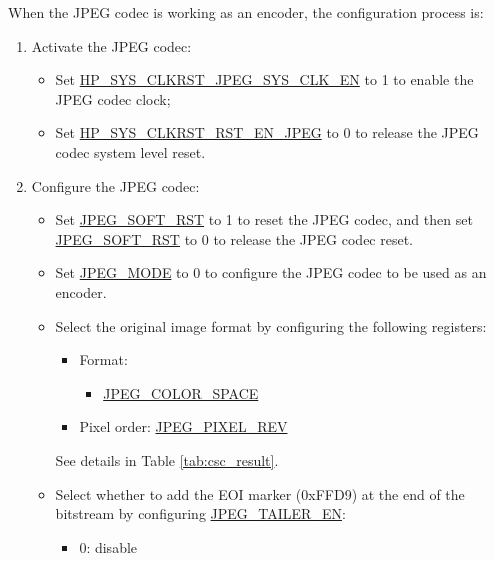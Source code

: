 \documentclass[main\_\_EN.tex]{subfiles}
\begin{document}
When the JPEG codec is working as an encoder, the configuration process is:
\begin{enumerate}
    \item Activate the JPEG codec:
    \begin{itemize}
        \item Set \hyperref[fielddesc:HPSYSCLKRSTJPEGSYSCLKEN]{HP\_SYS\_CLKRST\_JPEG\_SYS\_CLK\_EN} to 1 to enable the JPEG codec clock;
        \item Set \hyperref[fielddesc:HPSYSCLKRSTRSTENJPEG]{HP\_SYS\_CLKRST\_RST\_EN\_JPEG} to 0 to release the JPEG codec system level reset.
    \end{itemize}
    \item Configure the JPEG codec:
    \begin{itemize}
        \item Set \hyperref[fielddesc:JPEGSOFTRST]{JPEG\_SOFT\_RST} to 1 to reset the JPEG codec, and then set \hyperref[fielddesc:JPEGSOFTRST]{JPEG\_SOFT\_RST} to 0 to release the JPEG codec reset.
        \item Set \hyperref[fielddesc:JPEGMODE]{JPEG\_MODE} to 0 to configure the JPEG codec to be used as an encoder.
        \item Select the original image format by configuring the following registers:
        \begin{itemize}
            \item Format:
                \begin{itemize}
                    \item \hyperref[fielddesc:JPEGCOLORSPACE]{JPEG\_COLOR\_SPACE}
                \end{itemize}
            \item Pixel order: \hyperref[fielddesc:JPEGPIXELREV]{JPEG\_PIXEL\_REV}
        \end{itemize}
        See details in Table \ref{tab:csc_result}.
        \item Select whether to add the EOI marker (0xFFD9) at the end of the bitstream by configuring \hyperref[fielddesc:JPEGTAILEREN]{JPEG\_TAILER\_EN}:
        \begin{itemize}
            \item 0: disable

\end{itemize}
\end{itemize}
\end{enumerate}
\end{document}
